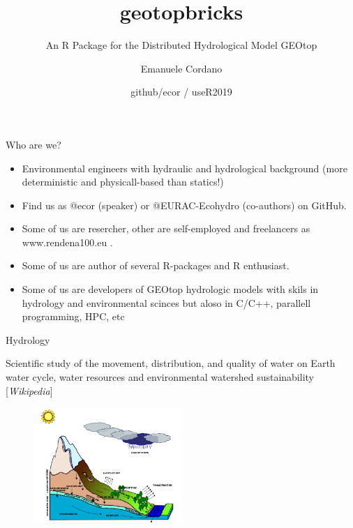 \documentclass[ignorenonframetext,]{beamer}
\title{geotopbricks}
\subtitle{An R Package for the Distributed Hydrological Model GEOtop}
\author{Emanuele Cordano}
\date{github/ecor / useR2019}
\providecommand{\tightlist}{%
  \setlength{\itemsep}{0pt}\setlength{\parskip}{0pt}}
\begin{document}
\frame{\titlepage}

\begin{frame}{Who are we?}

\begin{itemize}
\tightlist
\item
  Environmental engineers with hydraulic and hydrological background
  (more deterministic and physicall-based than statics!)
\item
  Find us as @ecor (speaker) or @EURAC-Ecohydro (co-authors) on GitHub.
\item
  Some of us are resercher, other are self-employed and freelancers as
  www.rendena100.eu .\\
\item
  Some of us are author of several R-packages and R enthusiast.
\item
  Some of us are developers of GEOtop hydrologic models with skils in
  hydrology and environmental scinces but aloso in C/C++, parallell
  programming, HPC, etc
\end{itemize}

\end{frame}

\begin{frame}{Hydrology}

Scientific study of the movement, distribution, and quality of water on
Earth water cycle, water resources and environmental watershed
sustainability {[}\emph{Wikipedia}{]}

\begin{figure}
\centering
\includegraphics[width=0.50000\textwidth]{resources/images/geotop_landscape.png}
\caption{}
\end{figure}

\end{frame}
\end{document}
